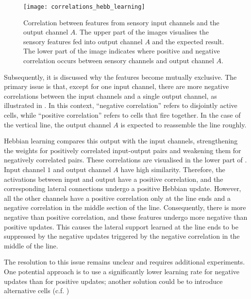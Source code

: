 \begin{figure}[h]
    \centering
    \texttt{[image: correlations\_hebb\_learning]}
    \caption[Feature correlation analysis]{Correlation between features from sensory input channels and the output channel $A$. The upper part of the images visualises the sensory features fed into output channel $A$ and the expected result. The lower part of the image indicates where positive and negative correlation occurs between sensory channels and output channel $A$.}
\end{figure}
%
Subsequently, it is discussed why the features become mutually exclusive.
The primary issue is that, except for one input channel, there are more negative correlations between the input channels and a single output channel, as illustrated in .
In this context, ``negative correlation'' refers to disjointly active cells, while ``positive correlation'' refers to cells that fire together.
In the case of the vertical line, the output channel $A$ is expected to reassemble the line roughly.

Hebbian learning compares this output with the input channels, strengthening the weights for positively correlated input-output pairs and weakening them for negatively correlated pairs.
These correlations are visualised in the lower part of .
Input channel $1$ and output channel $A$ have high similarity. Therefore, the activations between input and output have a positive correlation, and the corresponding lateral connections undergo a positive Hebbian update.
However, all the other channels have a positive correlation only at the line ends and a negative correlation in the middle section of the line.
Consequently, there is more negative than positive correlation, and these features undergo more negative than positive updates.
This causes the lateral support learned at the line ends to be suppressed by the negative updates triggered by the negative correlation in the middle of the line.

The resolution to this issue remains unclear and requires additional experiments. One potential approach is to use a significantly lower learning rate for negative updates than for positive updates; another solution could be to introduce alternative cells (c.f. )

